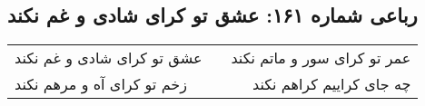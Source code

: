 \begin{center}
\section*{رباعی شماره ۱۶۱: عشق تو کرای شادی و غم نکند}
\label{sec:sh161}
\begin{longtable}{l p{0.5cm} r}
عشق تو کرای شادی و غم نکند
&&
عمر تو کرای سور و ماتم نکند
\\
زخم تو کرای آه و مرهم نکند
&&
چه جای کراییم کراهم نکند
\\
\end{longtable}
\end{center}
